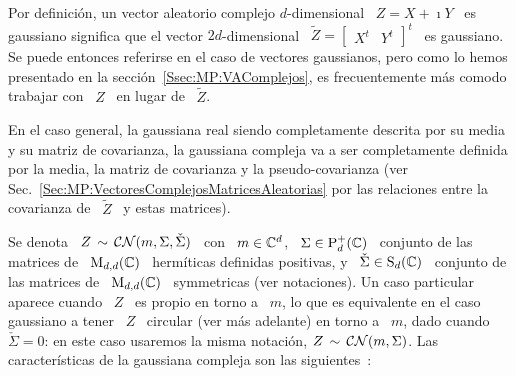 \label{Sssec:MP:GaussianaComplejas}

Por definici\'on, un vector aleatorio complejo $d$-dimensional \ $Z = X + \imath
Y$ \  es gaussiano significa que  el vector $2 d$-dimensional  \ $\widetilde{Z} =
\begin{bmatrix}  X^t &  Y^t \end{bmatrix}^t$  \ es  gaussiano. Se  puede entonces
referirse  en el  caso de  vectores gaussianos,  pero como  lo hemos presentado  en la
secci\'on~\ref{Ssec:MP:VAComplejos}, es frecuentemente m\'as comodo trabajar con
\  $Z$ \  en lugar  de \  $\widetilde{Z}$.

En el caso general, la gaussiana  real siendo completamente descrita por su media
y su matriz de covarianza, la  gaussiana compleja va a ser completamente definida
por   la  media,   la  matriz   de  covarianza   y  la   pseudo-covarianza  (ver
Sec.~\ref{Sec:MP:VectoresComplejosMatricesAleatorias}  por las  relaciones entre
la  covarianza  de  \ $\widetilde{Z}$  \  y  estas  matrices).

Se denota \ $Z \, \sim \, \mathcal{CN}(m,\Sigma,\check{\Sigma})$ \ con \ $m \in \mathbb{C}^d$,
\ $\Sigma \in \mathrm{P}_d^+(\mathbb{C})$ \ conjunto  de las matrices de \ $\mathrm{M}_{d,d}(\mathbb{C})$ \
herm\'iticas definidas positivas, y  \ $\check{\Sigma} \in \mathrm{S}_d(\mathbb{C})$ \ conjunto
de las matrices de \  $\mathrm{M}_{d,d}(\mathbb{C})$ \ symmetricas (ver notaciones).  Un caso
particular  aparece cuando  \ $Z$  \  es propio  en torno  a  \ $m$,  lo que  es
equivalente en el caso gaussiano a tener \ $Z$ \ circular (ver m\'as adelante) en
torno a  \ $m$, dado  cuando \  $\check{\Sigma} = 0$:  en este caso  usaremos la
misma notaci\'on,  $Z \,  \sim \, \mathcal{CN}(m,\Sigma)$.   Las caracter\'isticas  de la
gaussiana  compleja   son  las  siguientes~\cite{Lap17,   Pic96,  Goo63,  Bos95,
  SchSch03, EriKoi06}:

